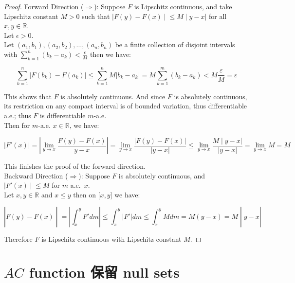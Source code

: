 \documentclass{qlnotes-export}
\begin{document}
\begin{proof}

Forward Direction (\(\Longrightarrow\)): Suppose \(F\) is Lipschitz continuous, and take Lipschitz constant \(M > 0\) such that \(\left. |F(y) - F(x) \middle| \leq M \middle| y - x| \right.\) for all \(x,y \in {\mathbb{R}}\).\\
Let \(\epsilon > 0\).\\
Let \(\left( {a_{1},b_{1}} \right),\left( {a_{2},b_{2}} \right),\ldots,\left( {a_{n},b_{n}} \right)\) be a finite collection of disjoint intervals with \(\sum_{k = 1}^{n}\left( {b_{k} - a_{k}} \right) < \frac{\epsilon}{M}\) then we have:

\[\sum\limits_{k = 1}^{n}\left| {F\left( b_{k} \right) - F\left( a_{k} \right)} \right| \leq \sum\limits_{k = 1}^{n}M\left| {b_{k} - a_{k}} \right| = M\sum\limits_{k = 1}^{m}\left( {b_{k} - a_{k}} \right) < M\frac{\varepsilon}{M} = \varepsilon\]

This shows that \(F\) is absolutely continuous. And since \(F\) is absolutely continuous, its restriction on any compact interval is of bounded variation, thus differentiable a.e.; thus \(F\) is differentiable \(m\)-a.e.\\
Then for \(m\)-a.e. \(x \in {\mathbb{R}}\), we have:

\[\left| {F'(x)} \right| = \left| {\lim\limits_{y\rightarrow x}\frac{F(y) - F(x)}{y - x}} \right| = \lim\limits_{y\rightarrow x}\frac{|F(y) - F(x)|}{|y - x|} \leq \lim\limits_{y\rightarrow x}\frac{\left. M \middle| y - x| \right.}{|y - x|} = \lim\limits_{y\rightarrow x}M = M\]

This finishes the proof of the forward direction.\\
Backward Direction (\(\Longrightarrow\)): Suppose \(F\) is absolutely continuous, and \(\left. |F'(x) \middle| \leq M \right.\) for \(m\)-a.e.~\(x\).\\
Let \(x,y \in {\mathbb{R}}\) and \(x \leq y\) then on \(\lbrack x,y\rbrack\) we have:

\[\left. |F(y) - F(x) \middle| = \left| {\int_{x}^{y}F'dm} \right| \leq \int_{x}^{y}\left| F' \right|dm \leq \int_{x}^{y}Mdm = M(y - x) = M \middle| y - x| \right.\]

Therefore \(F\) is Lipschitz continuous with Lipschitz constant \(M\).

\end{proof}

\section{\texorpdfstring{\(AC\) function 保留 null sets}{AC function 保留 null sets}}\label{ac-function-ux4fddux7559-null-sets}
\end{document}
